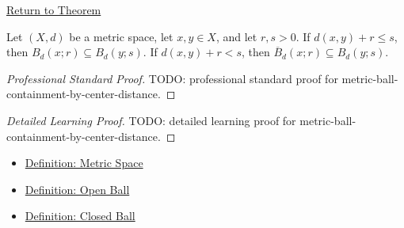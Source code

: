 \newpage
{}
\label{prf:metric-ball-containment-by-center-distance}

\begin{remark*}[Return]
\hyperref[thm:metric-ball-containment-by-center-distance]{Return to Theorem}
\end{remark*}

\begin{theorem*}
Let \((X,d)\) be a metric space, let \(x,y\in X\), and let \(r,s>0\).
If \(d(x,y)+r\leq s\), then \(B_d(x;r)\subseteq B_d(y;s)\).  If
\(d(x,y)+r<s\), then \(\overline{B}_d(x;r)\subseteq B_d(y;s)\).
\end{theorem*}

\begin{proof}[Professional Standard Proof]
\LRAProofBodyStart
TODO: professional standard proof for metric-ball-containment-by-center-distance.
\end{proof}

\begin{proof}[Detailed Learning Proof]
\LRAProofBodyStart
TODO: detailed learning proof for metric-ball-containment-by-center-distance.
\end{proof}

\begin{remark*}
\end{remark*}

\begin{dependencies}
\begin{itemize}
  \item \hyperref[def:metric-space]{Definition: Metric Space}
  \item \hyperref[def:metric-open-ball]{Definition: Open Ball}
  \item \hyperref[def:metric-closed-ball]{Definition: Closed Ball}
\end{itemize}
\end{dependencies}

\clearpage
